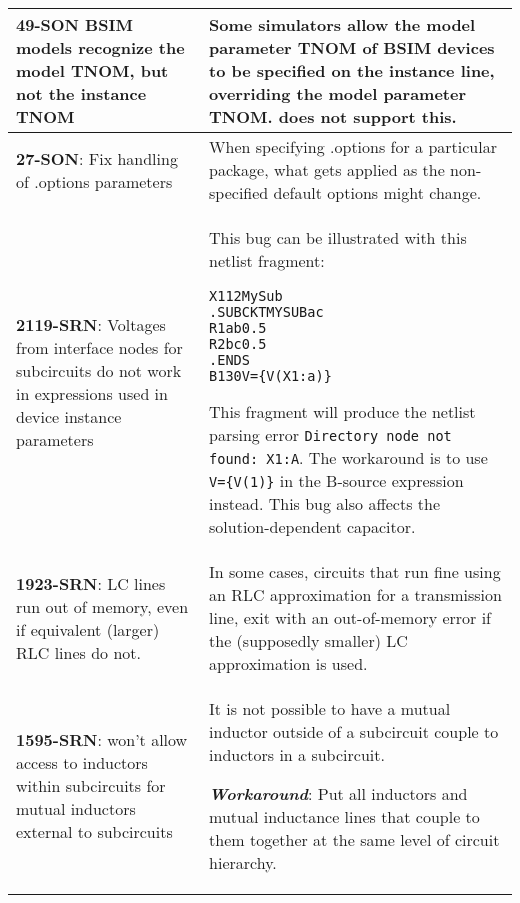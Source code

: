 {\begin{longtable}[h] {>{\raggedright\small}m{2in}|>{\raggedright\let\\\tabularnewline\small}m{3.5in}}
\textbf{49-SON} \Xyce{} BSIM models recognize the model TNOM, but not the
instance TNOM & Some simulators allow the model parameter TNOM of BSIM
devices to be specified on the instance line, overriding the model
parameter TNOM.  \Xyce{} does not support this.
\\ \hline


\textbf{27-SON}: Fix handling of .options parameters & When specifying .options
for a particular package, what gets applied as the non-specified
default options might change.  \\ \hline

\textbf{2119-SRN}: Voltages from interface nodes for subcircuits do not 
work in expressions used in device instance parameters & This bug can be
illustrated with this netlist fragment:
\begin{alltt}
X1 1 2 MySub
.SUBCKT MYSUB a c
R1   a b 0.5
R2   b c 0.5
.ENDS
B1 3 0 V=\{V(X1:a)\}
\end{alltt}
This fragment will produce the netlist parsing error \texttt{Directory 
node not found: X1:A}.  The workaround is to use \texttt{V=\{V(1)\}} 
in the B-source expression instead.  This bug also affects the 
solution-dependent capacitor.
\\ \hline

\textbf{1923-SRN}: LC lines run out of memory, even if equivalent (larger) RLC
lines do not. & In some cases, circuits that run fine using an RLC
approximation for a transmission line, exit with an out-of-memory
error if the (supposedly smaller) LC approximation is used.
\\ \hline

\textbf{1595-SRN}: \Xyce{} won't allow access to inductors within subcircuits
for mutual inductors external to subcircuits & It is not possible to
have a mutual inductor outside of a subcircuit couple to inductors in
a subcircuit.

\textbf{\textit{Workaround}}: Put all inductors and mutual inductance lines
that couple to them together at the same level of circuit hierarchy.
\\ \hline

\end{longtable}
}
